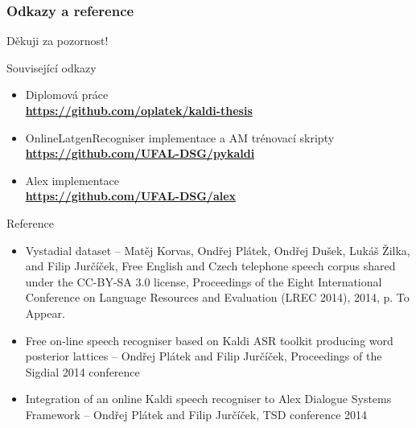 \begin{frame}\frametitle{Odkazy a reference}
    Děkuji za pozornost! \\
    \begin{exampleblock}{Související odkazy}
        \begin{itemize}
            \item Diplomová práce \\ {\bf \url{https://github.com/oplatek/kaldi-thesis}}
            \item OnlineLatgenRecogniser implementace a AM trénovací skripty \\ {\bf \url{https://github.com/UFAL-DSG/pykaldi}} 
            \item Alex implementace \\ {\bf \url{https://github.com/UFAL-DSG/alex}} 
        \end{itemize}
    \end{exampleblock}
    \begin{exampleblock}{Reference}
        \tiny
        \begin{itemize}
            \item Vystadial dataset --  Matěj Korvas, Ondřej Plátek, Ondřej Dušek, Lukáš Žilka, and Filip Jurčíček, Free English and Czech telephone speech corpus shared under the CC-BY-SA 3.0 license, Proceedings of the Eight International Conference on Language Resources and Evaluation (LREC 2014), 2014, p. To Appear.
            \item Free on-line speech recogniser based on Kaldi ASR toolkit producing word posterior lattices -- Ondřej Plátek and Filip Jurčíček, Proceedings of the Sigdial 2014 conference
            \item Integration of an online Kaldi speech recogniser to Alex Dialogue Systems Framework -- Ondřej Plátek and Filip Jurčíček, TSD conference 2014
        \end{itemize}
    \end{exampleblock}
\end{frame}

